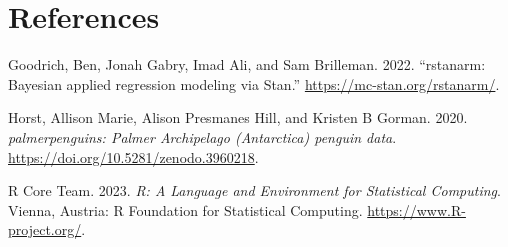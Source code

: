 \documentclass[
  letterpaper,
  DIV=11,
  numbers=noendperiod]{scrartcl}
\newlength{\cslhangindent}
\newenvironment{CSLReferences}[2] %
 {\begin{list}{}{%
  \setlength{\itemindent}{0pt}
  \setlength{\leftmargin}{0pt}
  \setlength{\parsep}{0pt}
  \ifodd #1
   \setlength{\leftmargin}{\cslhangindent}
   \setlength{\itemindent}{-1\cslhangindent}
  \fi
  \setlength{\itemsep}{#2\baselineskip}}}
 {\end{list}}
\begin{document}
\newpage

\section*{References}\label{references}

\label{refs}
\begin{CSLReferences}{1}{0}
Goodrich, Ben, Jonah Gabry, Imad Ali, and Sam Brilleman. 2022.
{``{rstanarm: {Bayesian} applied regression modeling via {Stan}}.''}
\url{https://mc-stan.org/rstanarm/}.

Horst, Allison Marie, Alison Presmanes Hill, and Kristen B Gorman. 2020.
\emph{{palmerpenguins: Palmer Archipelago (Antarctica) penguin data}}.
\url{https://doi.org/10.5281/zenodo.3960218}.

R Core Team. 2023. \emph{{R: A Language and Environment for Statistical
Computing}}. Vienna, Austria: R Foundation for Statistical Computing.
\url{https://www.R-project.org/}.

\end{CSLReferences}
\end{document}
